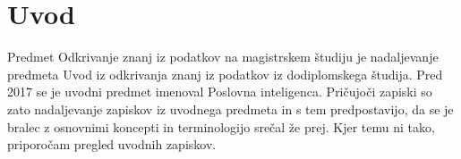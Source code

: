 \chapter*{Uvod}

Predmet Odkrivanje znanj iz podatkov na magistrskem študiju je nadaljevanje predmeta Uvod iz odkrivanja znanj iz podatkov iz dodiplomskega študija. Pred 2017 se je uvodni predmet imenoval Poslovna inteligenca. Pričujoči zapiski so zato nadaljevanje zapiskov iz uvodnega predmeta in s tem predpostavijo, da se je bralec z osnovnimi koncepti in terminologijo srečal že prej. Kjer temu ni tako, priporočam pregled uvodnih zapiskov.

\cleardoublepage
